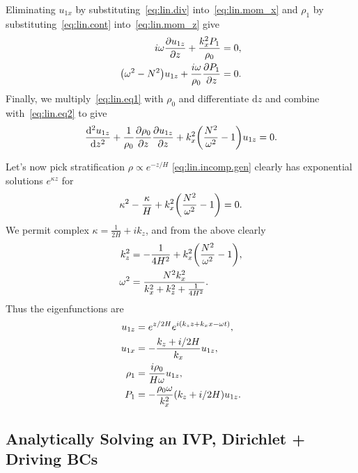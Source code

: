 \documentclass[11pt,
        usenames, %
        dvipsnames %
    ]{report}
\newcommand*{\pd}[2]{\frac{\partial#1}{\partial#2}}
\newcommand*{\rtd}[2]{\frac{\mathrm{d}^2#1}{\mathrm{d}#2^2}}
\DeclarePairedDelimiter\p{\lparen}{\rparen}
\begin{document}
Eliminating $u_{1x}$ by substituting~\eqref{eq:lin.div}
into~\eqref{eq:lin.mom_x} and $\rho_1$ by substituting~\eqref{eq:lin.cont}
into~\eqref{eq:lin.mom_z} give
\begin{subequations}
    \begin{align}
        i\omega \pd{u_{1z}}{z} + \frac{k_x^2 P_1}{\rho_0} &= 0,
            \label{eq:lin.eq1}\\
        \p*{\omega^2 - N^2 }u_{1z} + \frac{i\omega}{\rho_0}\pd{P_1}{z} &= 0.
            \label{eq:lin.eq2}
    \end{align}
\end{subequations}
Finally, we multiply~\eqref{eq:lin.eq1} with $\rho_0$ and differentiate
$\mathrm{d}z$ and combine with~\eqref{eq:lin.eq2} to give
\begin{equation}
    \rtd{u_{1z}}{z} + \frac{1}{\rho_0}\pd{\rho_0}{z}\pd{u_{1z}}{z}
        + k_x^2\p*{\frac{N^2}{\omega^2} - 1}u_{1z} = 0.\label{eq:lin.incomp.gen}
\end{equation}

Let's now pick stratification $\rho \propto e^{-z/H}$
\autoref{eq:lin.incomp.gen} clearly has exponential solutions $e^{\kappa z}$ for
\begin{equation}
    \kappa^2 - \frac{\kappa}{H} + k_x^2\p*{\frac{N^2}{\omega^2} - 1} = 0.
\end{equation}
We permit complex $\kappa = \frac{1}{2H} + ik_z$, and from the above clearly
\begin{align}
    k_z^2 &= -\frac{1}{4H^2} + k_x^2\p*{\frac{N^2}{\omega^2} - 1},\nonumber\\
    \omega^2 &= \frac{N^2k_x^2}{k_x^2 + k_z^2 +
        \frac{1}{4H^2}}.\label{eq:strat_disp}
\end{align}
Thus the eigenfunctions are
\begin{equation}
    \begin{split}
        u_{1z} &= e^{z/2H} e^{i(k_zz + k_xx - \omega t)},\\
        u_{1x} &= -\frac{k_z + i/2H}{k_x} u_{1z},\\
        \rho_1 &= \frac{i \rho_0}{H\omega} u_{1z},\\
        P_1 &= -\frac{\rho_0 \omega}{k_x^2}\p*{k_z + i/2H}u_{1z}.
    \end{split}\label{eq:strat_eigens}
\end{equation}

\subsection{Analytically Solving an IVP, Dirichlet + Driving BCs}
\end{document}
